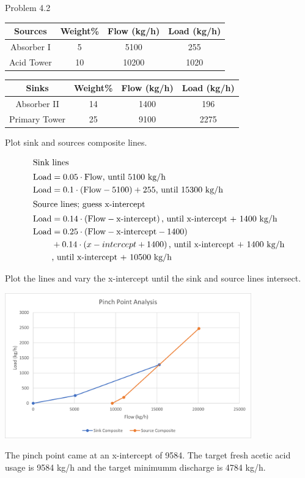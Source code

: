 \item Problem 4.2

\begin{center}
    \begin{tabular}{|c|c|c|c|}
        \hline
        Sources & Weight\% & Flow (kg/h) & Load (kg/h) \\
        \hline
        Absorber I & 5 & 5100 & 255 \\
        Acid Tower & 10 & 10200 & 1020 \\
        \hline
    \end{tabular} 
    
    \begin{tabular}{|c|c|c|c|}
        \hline
        Sinks & Weight\% & Flow (kg/h) & Load (kg/h) \\
        \hline
        Absorber II & 14 & 1400 & 196 \\
        Primary Tower & 25 & 9100 & 2275 \\
        \hline
    \end{tabular} 
\end{center}

Plot sink and sources composite lines.

\begin{align*}
    \intertext{Sink lines}
    \text{Load} &= 0.05 \cdot \text{Flow} \text{, until 5100 kg/h} \\
    \text{Load} &= 0.1 \cdot \left(\text{Flow} - 5100\right) + 255 \text{, until 15300 kg/h} \\
    \intertext{Source lines; guess x-intercept}
    \text{Load} &= 0.14 \cdot \left(\text{Flow} - \text{x-intercept}\right) \text{, until x-intercept + 1400 kg/h} \\
    \text{Load} &= 0.25 \cdot \left(\text{Flow} - \text{x-intercept} - 1400\right) \\ 
    & + 0.14 \cdot \left(x-intercept + 1400\right) \text{, until x-intercept + 1400 kg/h} \\ 
    & \text{, until x-intercept + 10500 kg/h} \\
\end{align*}

Plot the lines and vary the x-intercept until the sink and source lines intersect.

\begin{center}
    \includegraphics[width=0.8\textwidth]{assets/p2.png}
\end{center}

The pinch point came at an x-intercept of 9584. The target fresh acetic acid usage is 9584 kg/h and the target minimumm discharge is 4784 kg/h.